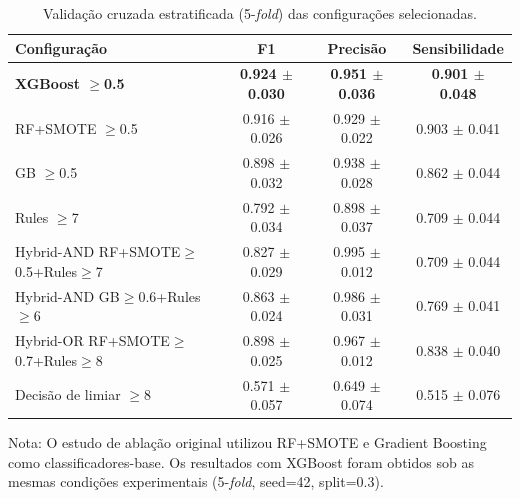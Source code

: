 \begin{table}[htbp]
\centering
\caption{Valida\c{c}\~ao cruzada estratificada (5-\textit{fold}) das configura\c{c}\~oes selecionadas.}
\label{tab:cv-5fold}
\begin{tabular}{lccc}
\toprule
Configura\c{c}\~ao & F1 & Precis\~ao & Sensibilidade \\
\midrule
\textbf{XGBoost $\geq$0.5} & \textbf{0.924 $\pm$ 0.030} & \textbf{0.951 $\pm$ 0.036} & \textbf{0.901 $\pm$ 0.048} \\
RF+SMOTE $\geq$0.5 & 0.916 $\pm$ 0.026 & 0.929 $\pm$ 0.022 & 0.903 $\pm$ 0.041 \\
GB $\geq$0.5 & 0.898 $\pm$ 0.032 & 0.938 $\pm$ 0.028 & 0.862 $\pm$ 0.044 \\
Rules $\geq$7 & 0.792 $\pm$ 0.034 & 0.898 $\pm$ 0.037 & 0.709 $\pm$ 0.044 \\
Hybrid-AND RF+SMOTE$\geq$0.5+Rules$\geq$7 & 0.827 $\pm$ 0.029 & 0.995 $\pm$ 0.012 & 0.709 $\pm$ 0.044 \\
Hybrid-AND GB$\geq$0.6+Rules$\geq$6 & 0.863 $\pm$ 0.024 & 0.986 $\pm$ 0.031 & 0.769 $\pm$ 0.041 \\
Hybrid-OR RF+SMOTE$\geq$0.7+Rules$\geq$8 & 0.898 $\pm$ 0.025 & 0.967 $\pm$ 0.012 & 0.838 $\pm$ 0.040 \\
Decisão de limiar $\geq$8 & 0.571 $\pm$ 0.057 & 0.649 $\pm$ 0.074 & 0.515 $\pm$ 0.076 \\
\bottomrule
\end{tabular}
\begin{tablenotes}
\small
\item Nota: O estudo de abla\c{c}\~ao original utilizou RF+SMOTE e Gradient Boosting como classificadores-base. Os resultados com XGBoost foram obtidos sob as mesmas condi\c{c}\~oes experimentais (5-\textit{fold}, seed=42, split=0.3).
\end{tablenotes}
\end{table}
